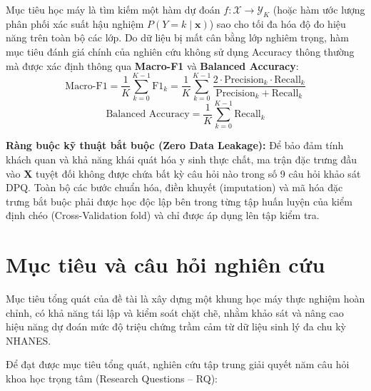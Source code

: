 Mục tiêu học máy là tìm kiếm một hàm dự đoán $f: \mathcal{X} \to \mathcal{Y}_K$ (hoặc hàm ước lượng phân phối xác suất hậu nghiệm $P(Y = k \mid \mathbf{x})$) sao cho tối đa hóa độ đo hiệu năng trên toàn bộ các lớp. Do dữ liệu bị mất cân bằng lớp nghiêm trọng, hàm mục tiêu đánh giá chính của nghiên cứu không sử dụng Accuracy thông thường mà được xác định thông qua \textbf{Macro-F1} và \textbf{Balanced Accuracy}:
\begin{equation}
    \text{Macro-F1} = \frac{1}{K} \sum_{k=0}^{K-1} \text{F1}_k = \frac{1}{K} \sum_{k=0}^{K-1} \frac{2 \cdot \text{Precision}_k \cdot \text{Recall}_k}{\text{Precision}_k + \text{Recall}_k}
\end{equation}
\begin{equation}
    \text{Balanced Accuracy} = \frac{1}{K} \sum_{k=0}^{K-1} \text{Recall}_k
\end{equation}

\textbf{Ràng buộc kỹ thuật bắt buộc (Zero Data Leakage):} Để bảo đảm tính khách quan và khả năng khái quát hóa y sinh thực chất, ma trận đặc trưng đầu vào $\mathbf{X}$ tuyệt đối không được chứa bất kỳ câu hỏi nào trong số 9 câu hỏi khảo sát DPQ. Toàn bộ các bước chuẩn hóa, điền khuyết (imputation) và mã hóa đặc trưng bắt buộc phải được học độc lập bên trong từng tập huấn luyện của kiểm định chéo (Cross-Validation fold) và chỉ được áp dụng lên tập kiểm tra.

\section{Mục tiêu và câu hỏi nghiên cứu}
\label{sec:muc-tieu-va-cau-hoi}

Mục tiêu tổng quát của đề tài là xây dựng một khung học máy thực nghiệm hoàn chỉnh, có khả năng tái lập và kiểm soát chặt chẽ, nhằm khảo sát và nâng cao hiệu năng dự đoán mức độ triệu chứng trầm cảm từ dữ liệu sinh lý đa chu kỳ NHANES. 

Để đạt được mục tiêu tổng quát, nghiên cứu tập trung giải quyết năm câu hỏi khoa học trọng tâm (Research Questions -- RQ):

